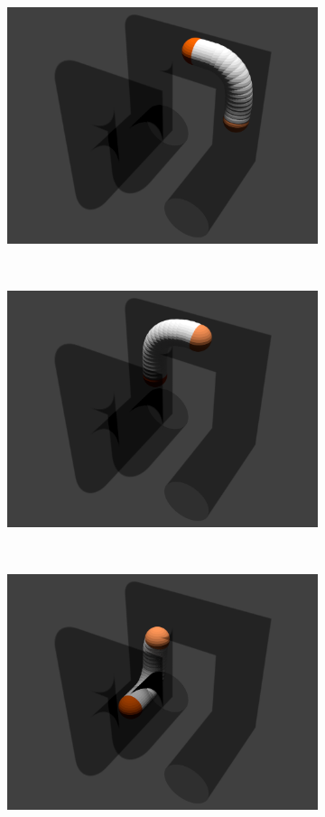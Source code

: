 \documentclass[12pt,a4]{article}
\begin{document}
\begin{figure}[ht!]
    \centering
    \begin{subfigure}{0.31\textwidth}
        \centering
        \includegraphics[width=0.8\linewidth]{figures/Pipesnaps/1.png}
   
    \end{subfigure}%
    ~
        \begin{subfigure}{0.31\textwidth}
        \centering
        \includegraphics[width=0.8\linewidth]{figures/Pipesnaps/2.png}
       
    \end{subfigure}%
    ~
        \begin{subfigure}{0.31\textwidth}
        \centering
        \includegraphics[width=0.8\linewidth]{figures/Pipesnaps/3.png}
      

\end{subfigure}
\end{figure}
\end{document}
